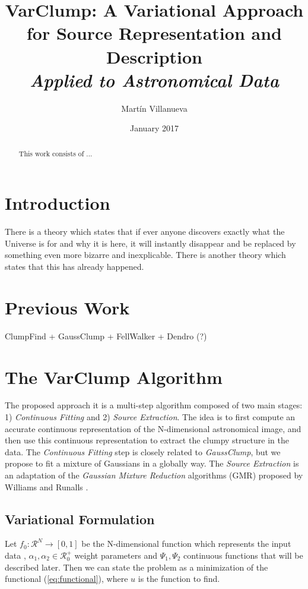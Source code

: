 \documentclass{article}
\title{%
  VarClump: A Variational Approach for Source Representation and Description \\
  \Large \textit{Applied to Astronomical Data} \\}
\author{Martín Villanueva }
\date{January 2017}
\begin{document}
\maketitle



\begin{abstract}
    This work consists of ...
\end{abstract}

\section{Introduction}
There is a theory which states that if ever anyone discovers exactly what the Universe is for and why it is here, it will instantly disappear and be replaced by something even more bizarre and inexplicable.
There is another theory which states that this has already happened.


\section{Previous Work}


ClumpFind \cite{WilliamsCF} + GaussClump \cite{Stutzki} + FellWalker \cite{Berry} + Dendro \cite{Rosolowsky} (?)



\section{The VarClump Algorithm}

The proposed approach it is a multi-step algorithm composed of two main stages: 1) \textit{Continuous Fitting} and 2) \textit{Source Extraction}. The idea is to first compute an accurate continuous representation of the N-dimensional astronomical image, and then use this continuous representation to extract the clumpy structure in the data. The \textit{Continuous Fitting} step is closely related to \textit{GaussClump}, but we propose to fit a mixture of Gaussians in a globally way. The \textit{Source Extraction} is an adaptation of the \textit{Gaussian Mixture Reduction} algorithms (GMR) proposed by Williams \cite{Williams} and Runalls \cite{Runalls}.

\subsection{Variational Formulation}

Let $f_0:\mathcal{R}^N \rightarrow [0,1]$ be the N-dimensional function which represents the input data , $\alpha_1,\alpha_2 \in \mathcal{R}_0^+$ weight parameters and $\Psi_1, \Psi_2$ continuous functions that will be described later. Then we can state the problem as a minimization of the functional (\ref{eq:functional}), where $u$ is the function to find.
\end{document}
